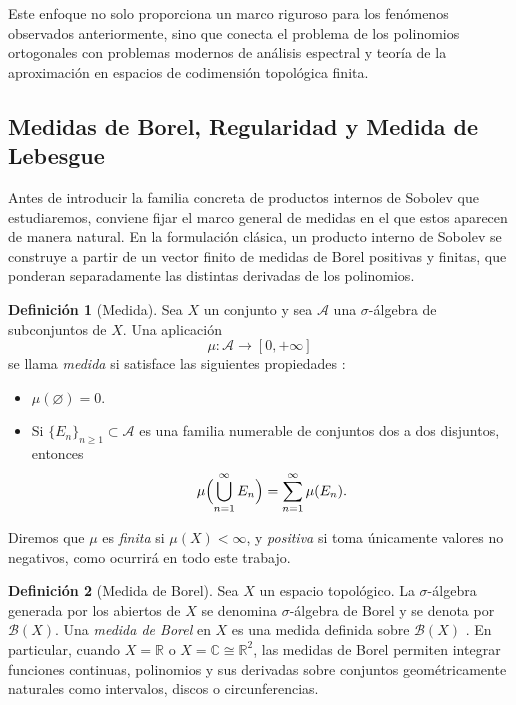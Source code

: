 \documentclass[12pt,a4paper]{article}
\theoremstyle{definition}
\newtheorem{definition}{Definición}
\theoremstyle{remark}
\begin{document}
Este enfoque no solo proporciona un marco riguroso para los fenómenos observados anteriormente, sino que conecta el problema de los polinomios ortogonales con problemas modernos de análisis espectral y teoría de la aproximación en espacios de codimensión topológica finita.

\subsection{Medidas de Borel, Regularidad y Medida de Lebesgue}

Antes de introducir la familia concreta de productos internos de Sobolev que estudiaremos, conviene fijar el marco general de medidas en el que estos aparecen de manera natural. En la formulación clásica, un producto interno de Sobolev se construye a partir de un vector finito de medidas de Borel positivas y finitas, que ponderan separadamente las distintas derivadas de los polinomios.

\begin{definition}[Medida]
  Sea $X$ un conjunto y sea $\mathcal{A}$ una $\sigma$-álgebra de subconjuntos de $X$. Una aplicación
  \[
    \mu : \mathcal{A} \to [0,+\infty]
  \]
  se llama \emph{medida} si satisface las siguientes propiedades \cite{folland1999real,rudin1987real}:
  \begin{itemize}
    \item $\mu(\varnothing)=0$.
    \item Si $\{E_n\}_{n\geq 1} \subset \mathcal{A}$ es una familia numerable de conjuntos dos a dos disjuntos, entonces
          \[
            \mu\Bigl(\bigcup_{n=1}^{\infty} E_n\Bigr)=\sum_{n=1}^{\infty}\mu(E_n).
          \]
  \end{itemize}
  Diremos que $\mu$ es \emph{finita} si $\mu(X)<\infty$, y \emph{positiva} si toma únicamente valores no negativos, como ocurrirá en todo este trabajo.
\end{definition}

\begin{definition}[Medida de Borel]
  Sea $X$ un espacio topológico. La $\sigma$-álgebra generada por los abiertos de $X$ se denomina $\sigma$-álgebra de Borel y se denota por $\mathcal{B}(X)$. Una \emph{medida de Borel} en $X$ es una medida definida sobre $\mathcal{B}(X)$ \cite{folland1999real,bogachev2007measure}. En particular, cuando $X=\mathbb{R}$ o $X=\mathbb{C}\cong\mathbb{R}^2$, las medidas de Borel permiten integrar funciones continuas, polinomios y sus derivadas sobre conjuntos geométricamente naturales como intervalos, discos o circunferencias.
\end{definition}
\end{document}
